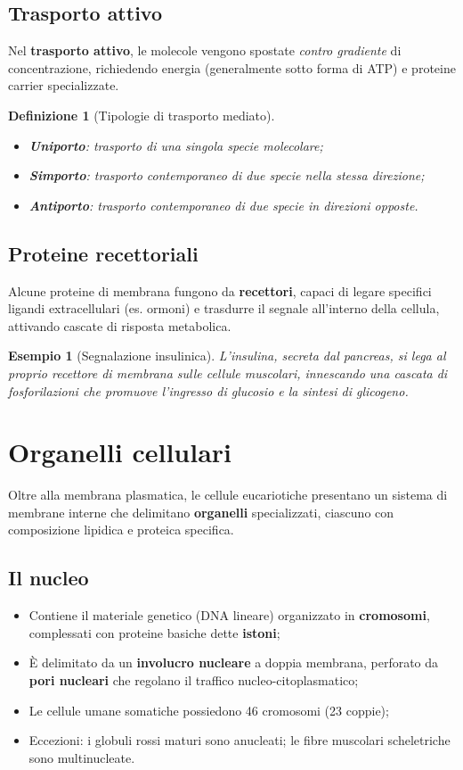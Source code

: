 \documentclass[12pt,a4paper]{report}
\newtheorem{definizione}{Definizione}[section]
\newtheorem{esempio}{Esempio}[section]
\begin{document}
\subsection{Trasporto attivo}
Nel \textbf{trasporto attivo}, le molecole vengono spostate \textit{contro gradiente} di concentrazione, richiedendo energia (generalmente sotto forma di ATP) e proteine carrier specializzate.
\begin{definizione}[Tipologie di trasporto mediato]
\begin{itemize}
\item \textbf{Uniporto}: trasporto di una singola specie molecolare;
\item \textbf{Simporto}: trasporto contemporaneo di due specie nella stessa direzione;
\item \textbf{Antiporto}: trasporto contemporaneo di due specie in direzioni opposte.
\end{itemize}
\end{definizione}
\subsection{Proteine recettoriali}
Alcune proteine di membrana fungono da \textbf{recettori}, capaci di legare specifici ligandi extracellulari (es. ormoni) e trasdurre il segnale all'interno della cellula, attivando cascate di risposta metabolica.
\begin{esempio}[Segnalazione insulinica]
L'insulina, secreta dal pancreas, si lega al proprio recettore di membrana sulle cellule muscolari, innescando una cascata di fosforilazioni che promuove l'ingresso di glucosio e la sintesi di glicogeno.
\end{esempio}

\section{Organelli cellulari}
Oltre alla membrana plasmatica, le cellule eucariotiche presentano un sistema di membrane interne che delimitano \textbf{organelli} specializzati, ciascuno con composizione lipidica e proteica specifica.
\subsection{Il nucleo}
\begin{itemize}
\item Contiene il materiale genetico (DNA lineare) organizzato in \textbf{cromosomi}, complessati con proteine basiche dette \textbf{istoni};
\item È delimitato da un \textbf{involucro nucleare} a doppia membrana, perforato da \textbf{pori nucleari} che regolano il traffico nucleo-citoplasmatico;
\item Le cellule umane somatiche possiedono 46 cromosomi (23 coppie);
\item Eccezioni: i globuli rossi maturi sono anucleati; le fibre muscolari scheletriche sono multinucleate.
\end{itemize}
\end{document}
